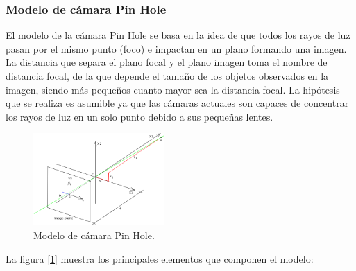 \documentclass{bmvc2k}
\begin{document}
\subsubsection{Modelo de cámara Pin Hole}

El modelo de la cámara Pin Hole se basa en la idea de que todos los rayos de luz pasan por el mismo punto (foco) e impactan en un plano formando una imagen. La distancia que separa el plano focal y el plano imagen toma el nombre de distancia focal, de la que depende el tamaño de los objetos observados en la imagen, siendo más pequeños cuanto mayor sea la distancia focal. La hipótesis que se realiza es asumible ya que las cámaras actuales son capaces de concentrar los rayos de luz en un solo punto debido a sus pequeñas lentes. 


\begin{figure}[H]
	\centering\includegraphics[width=5cm]{images/531px-Pinhole.png}
	\caption{Modelo de cámara Pin Hole. }
	\label{fig:Pin-Hole}
\end{figure}

La figura  [\ref{fig:Pin-Hole}] muestra los principales elementos que componen el modelo: 
\end{document}
